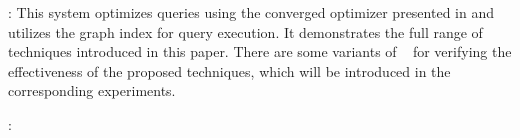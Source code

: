     \stitle{\name}: This system optimizes queries using the converged optimizer presented in  and utilizes the graph index for query execution. It demonstrates the full range of techniques introduced in this paper. There are some variants
of \name~ for verifying the effectiveness of the proposed techniques, which will be introduced in the corresponding experiments.

:




